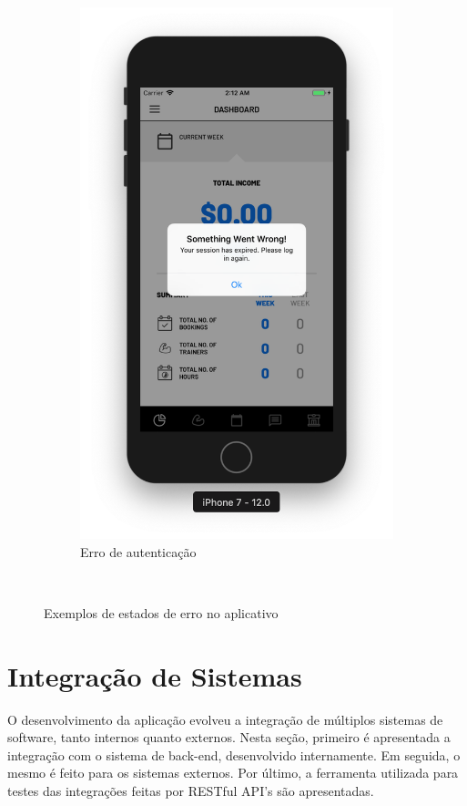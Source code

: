 \begin{figure}[H]
\begin{subfigure}[b]{0.4\textwidth}
        \includegraphics[width=\textwidth]{pfc/figuras/session-expired.png}
        \caption{Erro de autenticação}
        \label{fig:session-expired}
    \end{subfigure}
    ~
    \caption{Exemplos de estados de erro no aplicativo}
    \label{fig:error-states}
\end{figure}

\section{Integração de Sistemas}
O desenvolvimento da aplicação evolveu a integração de múltiplos sistemas de software, tanto internos quanto externos. Nesta seção, primeiro é apresentada a integração com o sistema de back-end, desenvolvido internamente. Em seguida, o mesmo é feito para os sistemas externos. Por último, a ferramenta utilizada para testes das integrações feitas por RESTful API's são apresentadas. 

